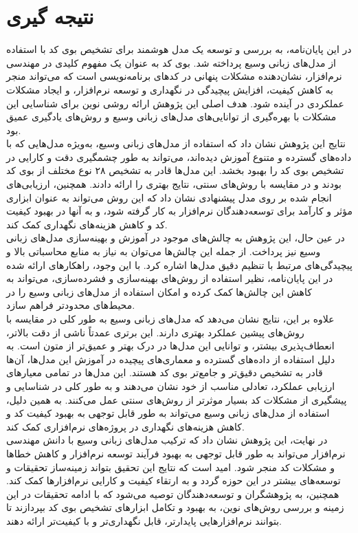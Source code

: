
\section{نتیجه گیری}
در این پایان‌نامه، به بررسی و توسعه یک مدل هوشمند برای تشخیص بوی کد با استفاده از مدل‌های زبانی وسیع پرداخته شد. بوی کد به عنوان یک مفهوم کلیدی در مهندسی نرم‌افزار، نشان‌دهنده مشکلات پنهانی در کدهای برنامه‌نویسی است که می‌تواند منجر به کاهش کیفیت، افزایش پیچیدگی در نگهداری و توسعه نرم‌افزار، و ایجاد مشکلات عملکردی در آینده شود. هدف اصلی این پژوهش ارائه روشی نوین برای شناسایی این مشکلات با بهره‌گیری از توانایی‌های مدل‌های زبانی وسیع و روش‌های یادگیری عمیق بود.
\\
نتایج این پژوهش نشان داد که استفاده از مدل‌های زبانی وسیع، به‌ویژه مدل‌هایی که با داده‌های گسترده و متنوع آموزش دیده‌اند، می‌تواند به طور چشمگیری دقت و کارایی در تشخیص بوی کد را بهبود بخشد. این مدل‌ها قادر به تشخیص ۲۸ نوع مختلف از بوی کد بودند و در مقایسه با روش‌های سنتی، نتایج بهتری را ارائه دادند. همچنین، ارزیابی‌های انجام شده بر روی مدل پیشنهادی نشان داد که این روش می‌تواند به عنوان ابزاری مؤثر و کارآمد برای توسعه‌دهندگان نرم‌افزار به کار گرفته شود، و به آنها در بهبود کیفیت کد و کاهش هزینه‌های نگهداری کمک کند.
\\
در عین حال، این پژوهش به چالش‌های موجود در آموزش و بهینه‌سازی مدل‌های زبانی وسیع نیز پرداخت. از جمله این چالش‌ها می‌توان به نیاز به منابع محاسباتی بالا و پیچیدگی‌های مرتبط با تنظیم دقیق مدل‌ها اشاره کرد. با این وجود، راهکارهای ارائه شده در این پایان‌نامه، نظیر استفاده از روش‌های بهینه‌سازی و فشرده‌سازی، می‌تواند به کاهش این چالش‌ها کمک کرده و امکان استفاده از مدل‌های زبانی وسیع را در محیط‌های محدودتر فراهم سازد.
\\

علاوه بر این، نتایج نشان می‌دهد که مدل‌های زبانی وسیع به طور کلی در مقایسه با روش‌های پیشین عملکرد بهتری دارند. این برتری عمدتاً ناشی از دقت بالاتر، انعطاف‌پذیری بیشتر، و توانایی این مدل‌ها در درک بهتر و عمیق‌تر از متون است. به دلیل استفاده از داده‌های گسترده و معماری‌های پیچیده در آموزش این مدل‌ها، آن‌ها قادر به تشخیص دقیق‌تر و جامع‌تر بوی کد هستند. این مدل‌ها در تمامی معیارهای ارزیابی عملکرد، تعادلی مناسب از خود نشان می‌دهند و به طور کلی در شناسایی و پیشگیری از مشکلات کد بسیار موثرتر از روش‌های سنتی عمل می‌کنند. به همین دلیل، استفاده از مدل‌های زبانی وسیع می‌تواند به طور قابل توجهی به بهبود کیفیت کد و کاهش هزینه‌های نگهداری در پروژه‌های نرم‌افزاری کمک کند.
\\
در نهایت، این پژوهش نشان داد که ترکیب مدل‌های زبانی وسیع با دانش مهندسی نرم‌افزار می‌تواند به طور قابل توجهی به بهبود فرآیند توسعه نرم‌افزار و کاهش خطاها و مشکلات کد منجر شود. امید است که نتایج این تحقیق بتواند زمینه‌ساز تحقیقات و توسعه‌های بیشتر در این حوزه گردد و به ارتقاء کیفیت و کارایی نرم‌افزارها کمک کند. همچنین، به پژوهشگران و توسعه‌دهندگان توصیه می‌شود که با ادامه تحقیقات در این زمینه و بررسی روش‌های نوین، به بهبود و تکامل ابزارهای تشخیص بوی کد بپردازند تا بتوانند نرم‌افزارهایی پایدارتر، قابل نگهداری‌تر و با کیفیت‌تر ارائه دهند.


